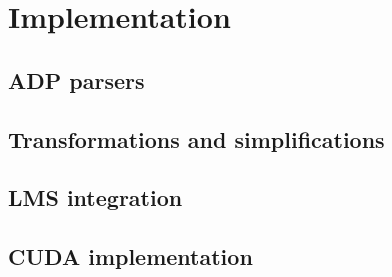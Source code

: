 \newpage
\section{Implementation}
\subsection{ADP parsers}
\subsection{Transformations and simplifications}
\subsection{LMS integration}
\subsection{CUDA implementation}
